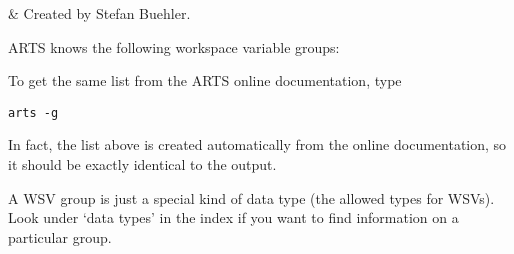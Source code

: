 \label{app:groups}


 & Created by Stefan Buehler. \\
\stophistory

ARTS knows the following workspace variable groups:


\noindent
To get the same list from the ARTS online documentation, type

\begin{verbatim}
arts -g
\end{verbatim}

\noindent
In fact, the list above is created automatically from the online
documentation, so it should be exactly identical to the
 output. 

A WSV group is just a special kind of data type (the allowed types for
WSVs). Look under `data types' in the index if you want to find
information on a particular group.


